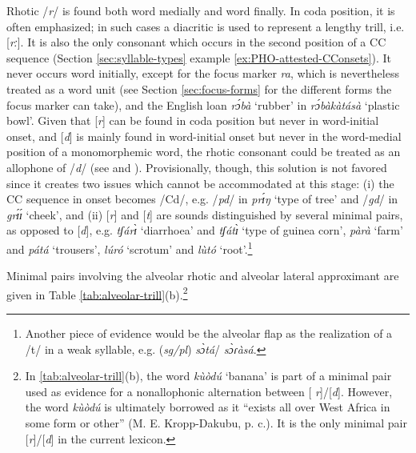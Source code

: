 Rhotic /{\it r}/ is found both word medially and word finally. In coda position, 
it is often emphasized; in such cases a diacritic is used to represent a lengthy 
trill, i.e. [{\it rː}]. It is also  the only consonant which occurs in the 
second position of a CC sequence  (Section \ref{sec:syllable-types} example 
\ref{ex:PHO-attested-CConsets}). It never occurs word initially, except for the 
focus marker {\it ra}, which is nevertheless treated as a word unit (see Section 
\ref{sec:focus-forms} for the different forms the focus marker can take), and  
the English loan {\it rɔ́bà} `rubber' in {\it rɔ́bàkàtásà} `plastic bowl'. 
Given that [{\it r}]  can be found in coda position but never in word-initial 
onset,  and [{\it d}] is mainly found in word-initial onset but never in the 
word-medial position of a monomorphemic word, the rhotic consonant could be 
treated as an allophone of /{\it d}/ (see  \citealt[30--31]{Awed02} and 
\citealt[62--64]{Daku02a}). Provisionally, though,  this solution is not favored 
since it creates two issues which cannot be accommodated at this stage: (i) the  
CC sequence in onset becomes /Cd/,  e.g. /{\it pd}/ in {\it prɪ́ŋ} `type of 
tree' and /{\it gd}/ in {\it grɪ́ɪ́} `cheek',  and (ii)  [{\it r}] and [{\it t}] 
are sounds distinguished by several minimal pairs, as opposed to [{\it d}], e.g. 
 {\it tʃárɪ̀} `diarrhoea' and  {\it tʃátɪ̀} `type of guinea corn', {\it pàrà} 
`farm' and  {\it pátá} `trousers',  {\it lúró} `scrotum' and  {\it lùtó} 
`root'.\footnote{Another piece of evidence would be the alveolar flap as the 
realization of a /t/ in a weak syllable, e.g.  ({\it sg/pl}) {\it sɔ̀tá}/{\it 
sɔ̀ɾàsá}.}

Minimal pairs involving the alveolar rhotic and alveolar lateral approximant are 
given in Table \ref{tab:alveolar-trill}(b).\footnote{In 
\ref{tab:alveolar-trill}(b), the word {\it kùòdú} `banana' is part of a 
minimal pair used as evidence for a  nonallophonic alternation between [{\it 
r}]/[{\it d}]. However, the word {\it kùòdú} is ultimately borrowed as it 
``exists all over West Africa in some form or other''  (M. E. Kropp-Dakubu, p. 
c.). It is the only minimal pair  [{\it r}]/[{\it d}] in the current lexicon.}



